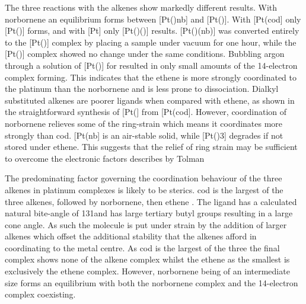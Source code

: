 The three reactions with the alkenes show markedly different results.  With norbornene an equilibrium forms between [Pt(\tButhixantphos)nb] and [Pt(\tButhixantphos)].  With [Pt(cod] only [Pt(\tButhixantphos)] forms, and with [Pt] only [Pt(\tButhixantphos)()] results. [Pt(\tButhixantphos)(nb)] was converted entirely to the [Pt(\tButhixantphos)] complex by placing a sample under vacuum for one hour, while the [Pt(\tButhixantphos)] complex showed no change under the same conditions.  Bubbling argon through a solution of [Pt(\tButhixantphos)] for  resulted in only small amounts of the 14-electron complex forming.  This indicates that the ethene is more strongly coordinated to the platinum than the norbornene and is less prone to dissociation.  Dialkyl substituted alkenes are poorer ligands when compared with ethene, as shown in the straightforward synthesis of [Pt(] from [Pt(cod].  However, coordination of norbornene relieves some of the ring-strain which means it coordinates more strongly than cod.  [Pt(nb] is an air-stable solid, while [Pt()3] degrades if not stored under ethene.  This suggests that the relief of ring strain may be sufficient to overcome the electronic factors describes by Tolman 


The predominating factor governing the coordination behaviour of the three alkenes in \tButhixantphos{} platinum complexes is likely to be sterics.  \Gls{cod} is the largest of the three alkenes, followed by norbornene, then ethene .  The \tButhixantphos{}ligand has a calculated natural bite-angle of 131\degrees and has large tertiary butyl groups resulting in a large cone angle.  As such the molecule is put under strain by the addition of larger alkenes which offset the additional stability that the alkenes afford in coordinating to the metal centre.  As \gls{cod} is the largest of the three the final complex shows none of the alkene complex whilst the ethene as the smallest is exclusively the ethene complex.  However, norbornene being of an intermediate size forms an equilibrium with both the norbornene complex and the 14-electron complex coexisting.  

